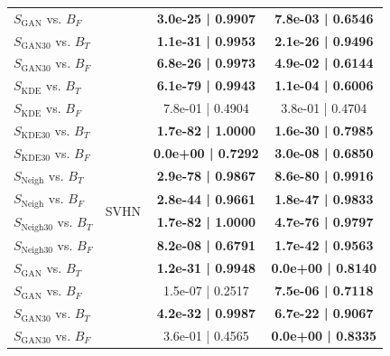\begin{table}[ht!]
\begin{minipage}[t]{0.98\textwidth}
{\begin{tabularx}{0.6\linewidth}{@{}lccc@{}}
$S_{\text{GAN}}$ vs. $B_{F}$     &                         & \textbf{3.0e-25 | 0.9907} & \textbf{7.8e-03 | 0.6546} \\
$S_{\text{GAN}30}$ vs. $B_{T}$   &                         & \textbf{1.1e-31 | 0.9953} & \textbf{2.1e-26 | 0.9496} \\
$S_{\text{GAN}30}$ vs. $B_{F}$   &                         & \textbf{6.8e-26 | 0.9973} & \textbf{4.9e-02 | 0.6144} \\
\cmidrule(rl){1-1} \cmidrule(rl){2-2}  \cmidrule(rl){3-4} 
$S_{\text{KDE}}$ vs. $B_{T}$     & \multirow{12}{*}{SVHN}  & \textbf{6.1e-79 | 0.9943} & \textbf{1.1e-04 | 0.6006} \\
$S_{\text{KDE}}$ vs. $B_{F}$     &                         & 7.8e-01 | 0.4904          & 3.8e-01 | 0.4704          \\
$S_{\text{KDE}30}$ vs. $B_{T}$   &                         & \textbf{1.7e-82 | 1.0000} & \textbf{1.6e-30 | 0.7985} \\
$S_{\text{KDE}30}$ vs. $B_{F}$   &                         & \textbf{0.0e+00 | 0.7292} & \textbf{3.0e-08 | 0.6850} \\
$S_{\text{Neigh}}$ vs. $B_{T}$   &                         & \textbf{2.9e-78 | 0.9867} & \textbf{8.6e-80 | 0.9916} \\
$S_{\text{Neigh}}$ vs. $B_{F}$   &                         & \textbf{2.8e-44 | 0.9661} & \textbf{1.8e-47 | 0.9833} \\
$S_{\text{Neigh}30}$ vs. $B_{T}$ &                         & \textbf{1.7e-82 | 1.0000} & \textbf{4.7e-76 | 0.9797} \\
$S_{\text{Neigh}30}$ vs. $B_{F}$ &                         & \textbf{8.2e-08 | 0.6791} & \textbf{1.7e-42 | 0.9563} \\
$S_{\text{GAN}}$ vs. $B_{T}$     &                         & \textbf{1.2e-31 | 0.9948} & \textbf{0.0e+00 | 0.8140} \\
$S_{\text{GAN}}$ vs. $B_{F}$     &                         & 1.5e-07 | 0.2517          & \textbf{7.5e-06 | 0.7118} \\
$S_{\text{GAN}30}$ vs. $B_{T}$   &                         & \textbf{4.2e-32 | 0.9987} & \textbf{6.7e-22 | 0.9067} \\
$S_{\text{GAN}30}$ vs. $B_{F}$   &                         & 3.6e-01 | 0.4565          & \textbf{0.0e+00 | 0.8335} \\
\bottomrule
\end{tabularx}
}
\label{tab:test_digits}
\end{minipage}
\vspace{-.2in}
\end{table}


